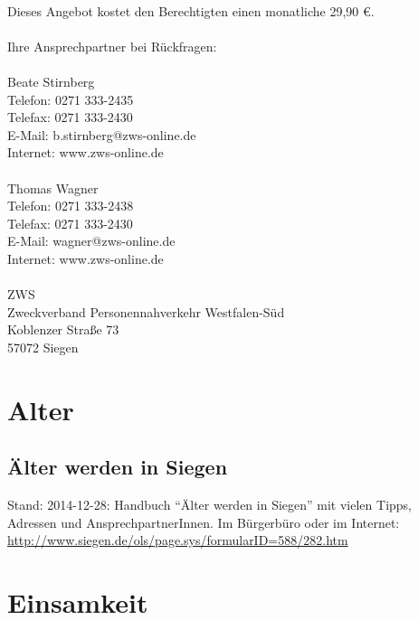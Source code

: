 \documentclass[11pt,fleqn]{book} %
\begin{document}
\\
Dieses Angebot kostet den Berechtigten einen monatliche 29,90 \euro.\\
\\
Ihre Ansprechpartner bei Rückfragen:\\
\\
Beate Stirnberg\\
Telefon: 0271 333-2435\\
Telefax: 0271 333-2430\\
E-Mail: b.stirnberg@zws-online.de\\
Internet: www.zws-online.de\\
\\
Thomas Wagner\\
Telefon: 0271 333-2438\\
Telefax: 0271 333-2430\\
E-Mail: wagner@zws-online.de\\
Internet: www.zws-online.de\\
\\
ZWS\\
Zweckverband Personennahverkehr Westfalen-Süd\\
Koblenzer Straße 73\\
57072 Siegen\\


\chapter{Alter}

\section{Älter werden in Siegen}
Stand: 2014-12-28: Handbuch \enquote{Älter werden in Siegen} mit vielen Tipps, Adressen und AnsprechpartnerInnen. Im Bürgerbüro oder im Internet:  \href{http://www.siegen.de/ols/page.sys/formularID=588/282.htm}{http://www.siegen.de/ols/page.sys/formularID=588/282.htm} 


\chapter{Einsamkeit}
\end{document}
